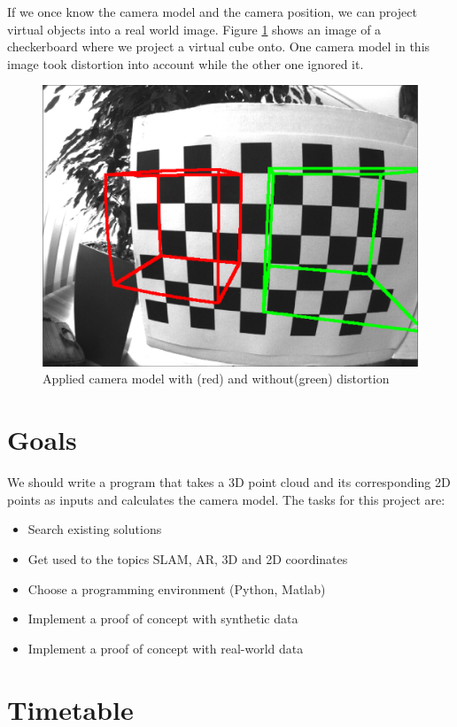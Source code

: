 \documentclass[11pt,a4paper,titlepage,oneside]{report}
\begin{document}
If we once know the camera model and the camera position, we can project virtual objects into a real world image. Figure \ref{fig:model} shows an image of a checkerboard where we project a virtual cube onto. One camera model in this image took distortion into account while the other one ignored it.
\begin{figure}[H]
  \begin{center}
		\includegraphics[width=1.0\textwidth]{img/model.png}
  \end{center}
	\caption{Applied camera model with (red) and without(green) distortion}\label{fig:model}
\end{figure}

\section{Goals}
We should write a program that takes a 3D point cloud and its corresponding 2D points as inputs and calculates the camera model. The tasks for this project are:
\begin{itemize}
\item Search existing solutions
\item Get used to the topics SLAM, AR, 3D and 2D coordinates
\item Choose a programming environment (Python, Matlab)
\item Implement a proof of concept with synthetic data
\item Implement a proof of concept with real-world data
\end{itemize}

\section{Timetable}
\end{document}
